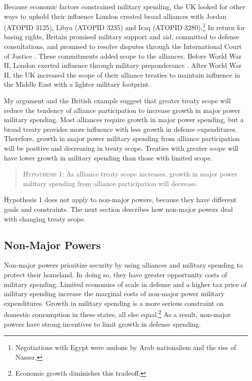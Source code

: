 \documentclass[12pt]{article}
\begin{document}
Because economic factors constrained military spending, the UK looked for other ways to uphold their influence \citep{Monroe1963, Louis1984}
London created broad alliances with Jordan (ATOPID 3125), Libya (ATOPID 3235) and Iraq (ATOPID 3280).\footnote{Negotiations with Egypt were undone by Arab nationalism and the rise of Nasser.} 
In return for basing rights, Britain promised military support and aid, committed to defense consultations, and promised to resolve disputes through the International Court of Justice \citep{Leedsetal2002}. 
These commitments added scope to the alliances. 
Before World War II, London exerted influence through military preponderance \citep{Monroe1963}.
After World War II, the UK increased the scope of their alliance treaties to maintain influence in the Middle East with a lighter military footprint. 


My argument and the British example suggest that greater treaty scope will reduce the tendency of alliance participation to increase growth in major power military spending.
Most alliances require growth in major power spending, but a broad treaty provides more influence with less growth in defense expenditures. 
Therefore, growth in major power military spending from alliance participation will be positive and decreasing in treaty scope. 
Treaties with greater scope will have lower growth in military spending than those with limited scope. 


\begin{quote}
\textsc{Hypothesis 1}: As alliance treaty scope increases, growth in major power military spending from alliance participation will decrease. 
\end{quote}


Hypothesis 1 does not apply to non-major powers, because they have different goals and constraints. 
The next section describes how non-major powers deal with changing treaty scope. 


\subsection{Non-Major Powers} 


Non-major powers prioritize security by using alliances and military spending to protect their homeland.  
In doing so, they have greater opportunity costs of military spending. 
Limited economies of scale in defense and a higher tax price of military spending increase the marginal costs of non-major power military expenditures. 
Growth in military spending is a more serious constraint on domestic consumption in these states, all else equal.\footnote{Economic growth diminishes this tradeoff.} 
As a result, non-major powers have strong incentives to limit growth in defense spending.
\end{document}
